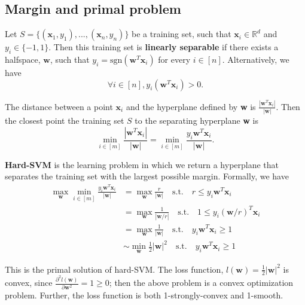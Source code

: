 \documentclass[../main.tex]{subfiles}
\begin{document}
\setlength{\parindent}{0pt}
\subsection{Margin and primal problem}
Let $S=\{ (\textbf{x}_1, y_1),..., (\textbf{x}_n, y_n)\}$ be a training set, such that $\textbf{x}_i\in \mathbb{R}^d$ and $y_i\in \{-1, 1\}$. Then this training set is \textbf{linearly separable} if there exists a halfspace, $\textbf{w}$, such that $y_i=\text{sgn}(\textbf{w}^T\textbf{x}_i)$ for every $i\in [n]$. Alternatively, we have $$\forall i\in [n], y_i(\textbf{w}^T\textbf{x}_i)>0.$$

The distance between a point $\textbf{x}_i$ and the hyperplane defined by \textbf{w} is $\frac{|\textbf{w}^T\textbf{x}_i|}{|\textbf{w}|}$. Then the closest point the training set $S$ to the separating hyperplane \textbf{w} is $$\min_{i\in [m]}\frac{|\textbf{w}^T\textbf{x}_i|}{|\textbf{w}|}=\min_{i\in [m]}\frac{y_i\textbf{w}^T\textbf{x}_i}{|\textbf{w}|}.$$

\textbf{Hard-SVM} is the learning problem in which we return a hyperplane that separates the training set with the largest possible margin. Formally, we have
\begin{equation} \label{eq3-1}
\begin{split}
\max_{\textbf{w}}\min_{i\in [m]}\frac{y_i\textbf{w}^T\textbf{x}_i}{|\textbf{w}|} & = \max_{\textbf{w}}\frac{r}{|\textbf{w}|} \quad\text{s.t.}\quad r\leq y_i\textbf{w}^T\textbf{x}_i \\
 & = \max_{\textbf{w}}\frac{1}{|\textbf{w}/r|} \quad\text{s.t.}\quad 1\leq y_i(\textbf{w}/r)^T\textbf{x}_i \\
 & = \max_{\textbf{w}}\frac{1}{|\textbf{w}|} \quad\text{s.t.}\quad y_i\textbf{w}^T\textbf{x}_i\geq 1 \\
 & \sim \min_{\textbf{w}}\frac{1}{2}|\textbf{w}|^2 \quad\text{s.t.}\quad y_i\textbf{w}^T\textbf{x}_i\geq 1
\end{split}
\end{equation}

This is the primal solution of hard-SVM. The loss function, $l(\textbf{w})=\frac{1}{2}|\textbf{w}|^2$ is convex, since $\frac{\partial^2 l(\textbf{w})}{\partial \textbf{w}^2}=1\geq 0$; then the above problem is a convex optimization problem. Further, the loss function is both 1-strongly-convex and 1-smooth.
\end{document}
